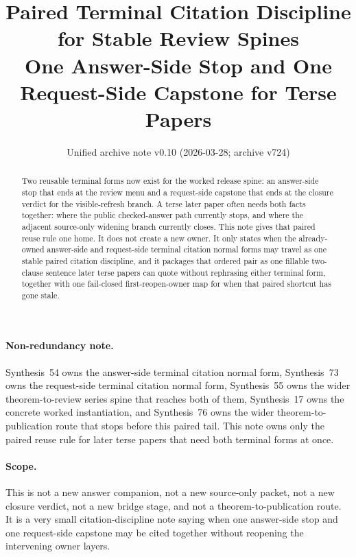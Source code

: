 \documentclass[11pt]{article}
\title{Paired Terminal Citation Discipline for Stable Review Spines\\
\large One Answer-Side Stop and One Request-Side Capstone for Terse Papers}
\author{}
\date{Unified archive note v0.10 (2026-03-28; archive v724)}
\begin{document}
\maketitle

\begin{abstract}
Two reusable terminal forms now exist for the worked release spine: an answer-side stop that ends at the review menu and a request-side capstone that ends at the closure verdict for the visible-refresh branch.
A terse later paper often needs both facts together: where the public checked-answer path currently stops, and where the adjacent source-only widening branch currently closes.
This note gives that paired reuse rule one home.
It does not create a new owner.
It only states when the already-owned answer-side and request-side terminal citation normal forms may travel as one stable paired citation discipline, and it packages that ordered pair as one fillable two-clause sentence later terse papers can quote without rephrasing either terminal form, together with one fail-closed first-reopen-owner map for when that paired shortcut has gone stale.
\end{abstract}

\paragraph{Non-redundancy note.}
Synthesis~54 owns the answer-side terminal citation normal form, Synthesis~73 owns the request-side terminal citation normal form, Synthesis~55 owns the wider theorem-to-review series spine that reaches both of them, Synthesis~17 owns the concrete worked instantiation, and Synthesis~76 owns the wider theorem-to-publication route that stops before this paired tail.\cite{series:challengeanswerreviewmenus,series:publicrequestresponsepacketrefreshresponsepacketclosureverdicts,series:seriesspines,series:workedexample,series:theoremtopublicationspine}
This note owns only the paired reuse rule for later terse papers that need both terminal forms at once.

\paragraph{Scope.}
This is not a new answer companion, not a new source-only packet, not a new closure verdict, not a new bridge stage, and not a theorem-to-publication route.
It is a very small citation-discipline note saying when one answer-side stop and one request-side capstone may be cited together without reopening the intervening owner layers.
\end{document}

